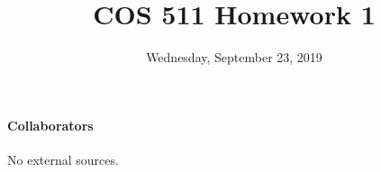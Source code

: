 \documentclass[12pt]{pset}
\title{COS 511 Homework 1}
\date{Wednesday, September 23, 2019}
\begin{document}
\maketitle

\pp\td

\closepp
\paragraph{Collaborators}
No external sources.
\td
\end{document}
